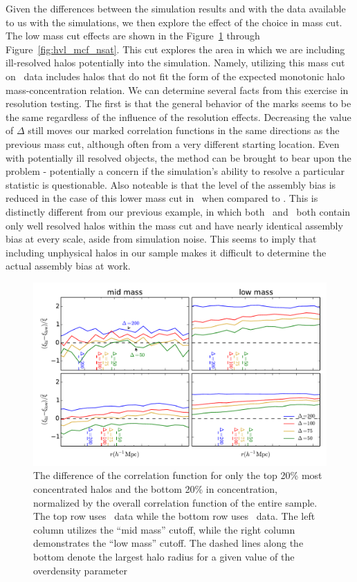 \documentclass[usenatbib,usegraphicx,letterpaper]{mn2e}
\begin{document}
Given the differences between the simulation results and with the data available to us with the \citet{diemer15} simulations, we then explore the effect of the choice in mass cut. The low mass cut effects are shown in the Figure~\ref{fig:hvl_cfcompare} through Figure~\ref{fig:hvl_mcf_nsat}. This cut explores the area in which we are including ill-resolved halos potentially into the simulation. Namely, utilizing this mass cut on \simB \ data includes halos that do not fit the form of the expected monotonic halo mass-concentration relation. We can determine several facts from this exercise in resolution testing. The first is that the general behavior of the marks seems to be the same regardless of the influence of the resolution effects. Decreasing the value of $\Delta$ still moves our marked correlation functions in the same directions as the previous mass cut, although often from a very different starting location. Even with potentially ill resolved objects, the method can be brought to bear upon the problem - potentially a concern if the simulation's ability to resolve a particular statistic is questionable. Also noteable is that the level of the assembly bias is reduced in the case of this lower mass cut in \simB \ when compared to \simA. This is distinctly different from our previous example, in which both \simA \ and \simB \ both contain only well resolved halos within the mass cut and have nearly identical assembly bias at every scale, aside from simulation noise. This seems to imply that including unphysical halos in our sample makes it difficult to determine the actual assembly bias at work.

\begin{figure}
	\centering
	\includegraphics[width=.9\textwidth]{all_cfhilow_z00_hostsvlow.pdf}
	\caption{The difference of the correlation function for only the top 20\% most concentrated halos and the bottom 20\% in concentration, normalized by the overall correlation function of the entire sample. The top row uses \simA \  data while the bottom row uses \simB \ data. The left column utilizes the ``mid mass'' cutoff, while the right column demonstrates the ``low mass'' cutoff. The dashed lines along the bottom denote the largest halo radius for a given value of the overdensity parameter}
	\label{fig:hvl_cfcompare}
\end{figure}
\end{document}
